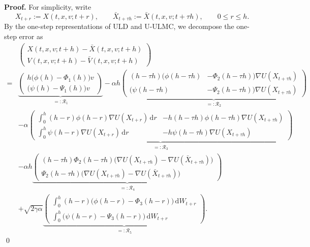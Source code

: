 \documentclass[12pt]{article}
\numberwithin{equation}{section}
\renewenvironment{proof}%
  {\begin{trivlist}%
   \item[]\ignorespaces}%
  {\qed\end{trivlist}}
\newcommand{\dd}{\mathrm{d}}
\begin{document}
\begin{proof}
\textbf{Proof.}
For simplicity, write
\[
X_{t+r}:=X(t,x,v;t+r),
\qquad
\bar X_{t+\tau h}:=\bar X(t,x,v;t+\tau h),
\qquad 0\leq r\leq h .
\]
By the one-step representations of ULD and U-ULMC, we decompose the one-step error as
\begin{align}
\label{eq:one-step-error-vector-decomposition}
&
\left(
\begin{aligned}
X(t,x,v;t+h)-\bar X(t,x,v;t+h)
\\
V(t,x,v;t+h)-\bar V(t,x,v;t+h)
\end{aligned}
\right)
\nonumber\\
=&
\underbrace{
\left(
\begin{aligned}
h\big(\phi(h)-\Phi_1(h)\big)v
\\
\big(\psi(h)-\Psi_1(h)\big)v
\end{aligned}
\right)
}_{=:\mathcal R_1}
-
\alpha h
\underbrace{
\left(
\begin{aligned}
 (h-\tau h)
\big(
\phi(h-\tau h)
&-
\Phi_2(h-\tau h)
\big)
\nabla U(X_{t+ \tau h})
\\
 \big(
\psi(h-\tau h)
& -
\Psi_2(h-\tau h)
\big)
\nabla U(X_{t+\tau h})
\end{aligned}
\right)
}_{=:\mathcal R_2}
\nonumber\\
&-
\alpha
\underbrace{
\left(
\begin{aligned}
\int_0^h
(h-r)\phi(h-r)\nabla U(X_{t+r})\,\dd r
& -
h(h-\tau h)\phi(h-\tau h)\nabla U(X_{t+\tau h})
\\
\int_0^h
\psi(h-r)\nabla U(X_{t+r})\,\dd r
& -
h\psi(h-\tau h)\nabla U(X_{t+ \tau h})
\end{aligned}
\right)
}_{=:\mathcal R_3}
\nonumber\\
&-
\alpha h
\underbrace{
\left(
\begin{aligned}
(h-\tau h)\Phi_2(h-\tau h)
\big(
\nabla U(X_{t+ \tau h})
-
\nabla U(\bar X_{t+ \tau h})
\big)
\\
\Psi_2(h-\tau h)
\big(
\nabla U(X_{t+ \tau h})
-
\nabla U(\bar X_{t+ \tau h})
\big)
\end{aligned}
\right)
}_{=:\mathcal R_4}
\nonumber\\
&+
\sqrt{2\gamma\alpha}
\underbrace{
\left(
\begin{aligned}
\displaystyle
\int_0^h
(h-r)
\big(
\phi(h-r)-\Phi_3(h-r)
\big)\,\dd W_{t+r}
\\
\displaystyle
\int_0^h
\big(
\psi(h-r)-\Psi_3(h-r)
\big)\,\dd W_{t+r}
\end{aligned}
\right)
}_{=:\mathcal R_5}.

\end{align}
\end{proof}
\end{document}
